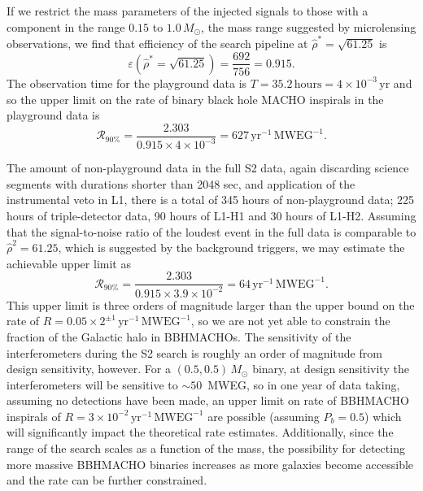 If we restrict the mass parameters of the injected signals to those with a
component in the range $0.15$ to $1.0\,M_\odot$, the mass range suggested by
microlensing observations, we find that efficiency of the search pipeline at
$\hat{\rho}^\ast = \sqrt{61.25}$ is 
\begin{equation}
\varepsilon\left( \hat{\rho}^\ast = \sqrt{61.25} \right) = \frac{ 692 } { 756
} = 0.915.
\end{equation}
The observation time for the playground data is $T = 35.2\,\mathrm{hours} = 4
\times 10^{-3}\,\mathrm{yr}$ and so the upper limit on the rate of binary
black hole MACHO inspirals in the playground data is
\begin{equation}
\mathcal{R}_{90\%} = \frac{2.303}{0.915 \times 4 \times 10^{-3}} = 
627\,\mathrm{yr}^{-1}\,\mathrm{MWEG}^{-1}.
\end{equation}

The amount of non-playground data in the full S2 data, again discarding
science segments with durations shorter than 2048 sec,  and application of the
instrumental veto in L1, there is a total of 345 hours of non-playground data;
225 hours of triple-detector data, 90 hours of L1-H1 and 30 hours of L1-H2.
Assuming that the signal-to-noise ratio of the loudest event in the full data
is comparable to $\hat{\rho}^2 = 61.25$, which is suggested by the background
triggers, we may estimate the achievable upper limit as
\begin{equation}
\mathcal{R}_{90\%} = \frac{2.303}{0.915 \times 3.9 \times 10^{-2}} = 
64\,\mathrm{yr}^{-1}\,\mathrm{MWEG}^{-1}.
\end{equation}
This upper limit is three orders of magnitude larger than the upper bound on
the rate of $R = 0.05\times2^{\pm 1}\,\mathrm{yr}^{-1}\,\mathrm{MWEG}^{-1}$,
so we are not yet able to constrain the fraction of the Galactic halo in
BBHMACHOs. The sensitivity of the interferometers during the S2 search is
roughly an order of magnitude from design sensitivity, however. For a
$(0.5,0.5)\,M_\odot$ binary, at design sensitivity the interferometers will be
sensitive to $\sim 50$~MWEG, so in one year of data taking, assuming no
detections have been made, an upper limit on rate of BBHMACHO inspirals of $R
= 3\times10^{-2}\,\mathrm{yr}^{-1}\,\mathrm{MWEG}^{-1}$ are possible (assuming
$P_b = 0.5$) which will significantly impact the theoretical rate estimates.
Additionally, since the range of the search scales as a function of the mass,
the possibility for detecting more massive BBHMACHO binaries increases as more
galaxies become accessible and the rate can be further constrained.


